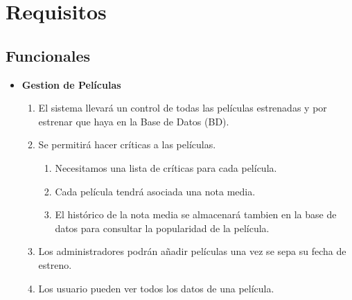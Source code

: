 \documentclass{article}
\begin{document}
\section{Requisitos}
    \subsection{Funcionales}
	\begin{itemize}
	
	\item \textbf{Gestion de Películas}
		\begin{enumerate}[label=\bfseries RF- \arabic*:]
		\item El sistema llevará un control de todas las películas estrenadas y por estrenar que haya en la Base de Datos (BD).
		\item Se permitirá hacer críticas a las películas.
			\begin{enumerate}[label=\bfseries 2.\arabic*:]
				\item Necesitamos una lista de críticas para cada película.
				\item Cada película tendrá asociada una nota media.
				\item El histórico de la nota media se almacenará tambien en la base de datos para consultar la popularidad de la película.
			\end{enumerate}
		\item Los administradores podrán añadir películas una vez se sepa su fecha de estreno.
		\item Los usuario pueden ver todos los datos de una película.
		\end{enumerate}
		

\end{itemize}
\end{document}
